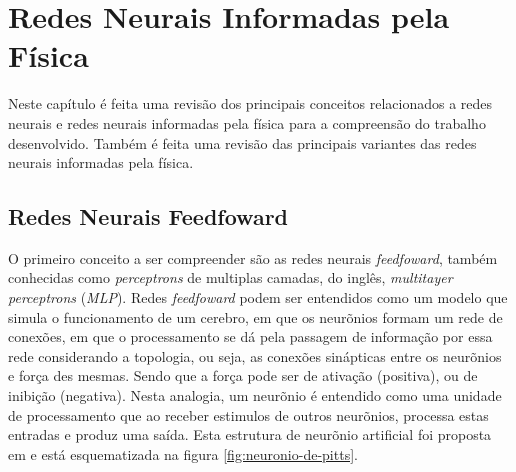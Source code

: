 \chapter{Redes Neurais Informadas pela Física}
\label{sec-pinns}

Neste capítulo é feita uma revisão dos principais conceitos relacionados a 
redes neurais e redes neurais informadas pela física para a compreensão do trabalho
desenvolvido. Também é feita uma revisão das principais variantes das redes neurais
informadas pela física.

\section{Redes Neurais Feedfoward}

O primeiro conceito a ser compreender são as redes neurais \textit{feedfoward},
também conhecidas como \textit{perceptrons} de multiplas camadas, do inglês,
\textit{multitayer perceptrons} (\textit{MLP}). Redes \textit{feedfoward} 
podem ser entendidos como um modelo que simula o funcionamento de um cerebro,
em que os neurõnios formam um rede de conexões, em que o processamento se dá
pela passagem de informação por essa rede considerando a topologia, ou seja, as
conexões sinápticas entre os neurõnios e força des mesmas. Sendo que a força
pode ser de ativação (positiva), ou de inibição (negativa).
Nesta analogia, um neurõnio é entendido como uma unidade de processamento que 
ao receber estimulos de outros neurõnios, processa estas entradas e 
produz uma saída. Esta estrutura de neurõnio artificial foi proposta em 
\cite{mcculloch-pitts:1943-perceptron} e está esquematizada na figura 
\ref{fig:neuronio-de-pitts}.  

